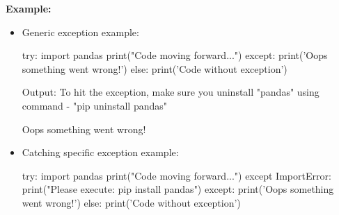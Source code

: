 \begin{flushleft}
	\newpage
	
	\textbf{Example:}
	\begin{itemize}
		\item Generic exception example:
		\begin{tcolorbox}[breakable,notitle,boxrule=-0pt,colback=code,colframe=code]
			\color{white}
			\font=8pt
			try: \newline
			\hphantom{} \hphantom{} import pandas \newline
			\hphantom{} \hphantom{} print("Code moving forward...") \newline
			except: \newline
			\hphantom{} \hphantom{} print('Oops something went wrong!') \newline
			else: \newline
			\hphantom{} \hphantom{} print('Code without exception')
			\font=4pt
		\end{tcolorbox}
		
		Output: To hit the exception, make sure you uninstall "pandas" using command - "pip uninstall pandas"
	
		\begin{tcolorbox}[breakable,notitle,boxrule=-0pt,colback=error,colframe=error]
			\color{black}
			Oops something went wrong!
			\font=4pt
		\end{tcolorbox}		


		\bigskip
		
		\item Catching specific exception example:
		\begin{tcolorbox}[breakable,notitle,boxrule=-0pt,colback=code,colframe=code]
			\color{white}
			\font=8pt
			try: \newline
			\hphantom{} \hphantom{} import pandas \newline
			\hphantom{} \hphantom{} print("Code moving forward...") \newline
			except ImportError: \newline			
			\hphantom{} \hphantom{} print("Please execute: pip install pandas") \newline
			except: \newline
			\hphantom{} \hphantom{} print('Oops something went wrong!') \newline
			else: \newline
			\hphantom{} \hphantom{} print('Code without exception')
			\font=4pt
		\end{tcolorbox}
		

\end{itemize}
\end{flushleft}
